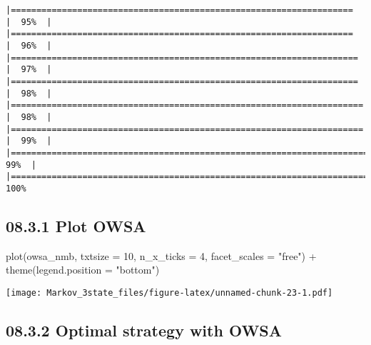 \documentclass[
]{article}
\newenvironment{Shaded}{\begin{snugshade}}{\end{snugshade}}
\newcommand{\AttributeTok}[1]{\textcolor[rgb]{0.77,0.63,0.00}{#1}}
\newcommand{\DecValTok}[1]{\textcolor[rgb]{0.00,0.00,0.81}{#1}}
\newcommand{\FunctionTok}[1]{\textcolor[rgb]{0.00,0.00,0.00}{#1}}
\newcommand{\NormalTok}[1]{#1}
\newcommand{\SpecialCharTok}[1]{\textcolor[rgb]{0.00,0.00,0.00}{#1}}
\newcommand{\StringTok}[1]{\textcolor[rgb]{0.31,0.60,0.02}{#1}}
\begin{document}
\begin{verbatim}
|===================================================================   |  95%  |                                                                              |===================================================================   |  96%  |                                                                              |====================================================================  |  97%  |                                                                              |====================================================================  |  98%  |                                                                              |===================================================================== |  98%  |                                                                              |===================================================================== |  99%  |                                                                              |======================================================================|  99%  |                                                                              |======================================================================| 100%
\end{verbatim}

\hypertarget{plot-owsa}{%
\subsection{08.3.1 Plot OWSA}\label{plot-owsa}}

\begin{Shaded}
\begin{Highlighting}[]
\FunctionTok{plot}\NormalTok{(owsa\_nmb, }\AttributeTok{txtsize =} \DecValTok{10}\NormalTok{, }\AttributeTok{n\_x\_ticks =} \DecValTok{4}\NormalTok{, }
     \AttributeTok{facet\_scales =} \StringTok{"free"}\NormalTok{) }\SpecialCharTok{+}
  \FunctionTok{theme}\NormalTok{(}\AttributeTok{legend.position =} \StringTok{"bottom"}\NormalTok{)}
\end{Highlighting}
\end{Shaded}

\texttt{[image: Markov\_3state\_files/figure-latex/unnamed-chunk-23-1.pdf]}

\hypertarget{optimal-strategy-with-owsa}{%
\subsection{08.3.2 Optimal strategy with
OWSA}\label{optimal-strategy-with-owsa}}
\end{document}
